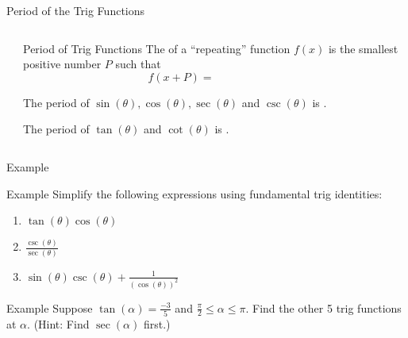 \documentclass[presentation]{beamer}
\begin{document}
\begin{frame}[label={sec:org1014581}]{Period of the Trig Functions}
\begin{columns}
\begin{column}{0.45\columnwidth}
\end{column}
\begin{column}{0.45\columnwidth}
\begin{block}{Period of Trig Functions}
The \uline{\hspace*{1in}} of a ``repeating'' function \(f(x)\) is the smallest
positive number \(P\) such that
\[
f(x + P) = \hspace{1in}\]

The period of \(\sin(\theta), \cos(\theta), \sec(\theta)\) and
\(\csc(\theta)\) is \uline{\hspace*{1in}}.

The period of \(\tan(\theta)\) and \(\cot(\theta)\) is \uline{\hspace*{1in}}.
\end{block}
\end{column}
\end{columns}
\end{frame}

\begin{frame}[label={sec:org09a6200}]{Example}
\end{frame}

\begin{frame}[label={sec:org162ec93}]{Example}
Simplify the following expressions using fundamental trig identities:
\begin{enumerate}
\item \(\tan(\theta)\cos(\theta)\)
\item \(\frac{\csc(\theta)}{\sec(\theta)}\)
\item \(\sin(\theta)\csc(\theta) + \frac{1}{(\cos(\theta))^2}\)
\end{enumerate}
\vspace{10in}   
\end{frame}

\begin{frame}[label={sec:orgc9d527f}]{Example}
Suppose \(\tan(\alpha) = \frac{-3}{5}\) and \(\frac{\pi}{2} \le \alpha \le \pi\).  Find
the other 5 trig functions at \(\alpha\).  (Hint: Find \(\sec(\alpha)\) first.)
\vspace{10in}
\end{frame}
\end{document}
